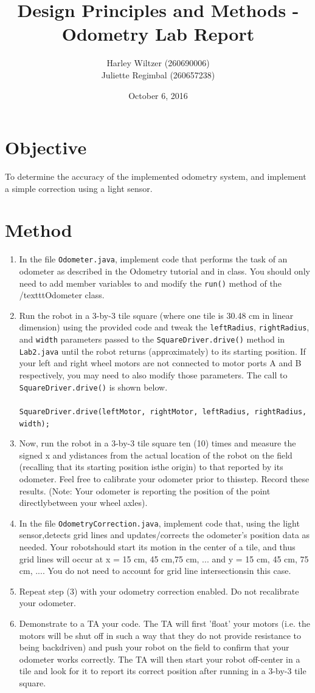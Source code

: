 \documentclass[11pt]{article} %
\title{Design Principles and Methods - Odometry Lab Report}
\author{Harley Wiltzer (260690006)\\Juliette Regimbal (260657238)}
\date{October 6, 2016} %
\begin{document}
\maketitle
{}
\section{Objective}
To determine the accuracy of the implemented odometry system, and implement a simple correction using a light sensor.
\section{Method}
\begin{enumerate}
\item In the file \texttt{Odometer.java}, implement code that performs the task of an odometer as
described in the Odometry tutorial and in class. You should only need to add member variables
to and modify the \texttt{run()} method of the /texttt{Odometer} class.
\item Run the robot in a 3-by-3 tile square (where one tile is 30.48 cm in linear dimension) using the
provided code and tweak the \texttt{leftRadius}, \texttt{rightRadius}, and \texttt{width} parameters passed
to the \texttt{SquareDriver.drive()} method in \texttt{Lab2.java} until the robot returns
(approximately) to its starting position. If your left and right wheel motors are not connected to
motor ports A and B respectively, you may need to also modify those parameters. The call to
\texttt{SquareDriver.drive()} is shown below.\\
\\
\texttt{SquareDriver.drive(leftMotor, rightMotor, leftRadius, rightRadius, width);}
\item Now, run the robot in a 3-by-3 tile square ten (10) times and measure the signed x and ydistances from the actual location of the robot on the field (recalling that its starting position isthe origin) to that reported by its odometer. Feel free to calibrate your odometer prior to thisstep. Record these results. (Note: Your odometer is reporting the position of the point directlybetween your wheel axles).
\item In the file \texttt{OdometryCorrection.java}, implement code that, using the light sensor,detects grid lines and updates/corrects the odometer's position data as needed. Your robotshould start its motion in the center of a tile, and thus grid lines will occur at x = 15 cm, 45 cm,75 cm, ... and y = 15 cm, 45 cm, 75 cm, .... You do not need to account for grid line intersectionsin this case.
\item Repeat step (3) with your odometry correction enabled. Do not recalibrate your odometer.
\item Demonstrate to a TA your code. The TA will first 'float' your motors (i.e. the motors will be shut off in such a way that they do not provide resistance to being backdriven) and push your robot on the field to confirm that your odometer works correctly. The TA will then start your robot off-center in a tile and look for it to report its correct position after running in a 3-by-3 tile square.
\end{enumerate}
\end{document}
